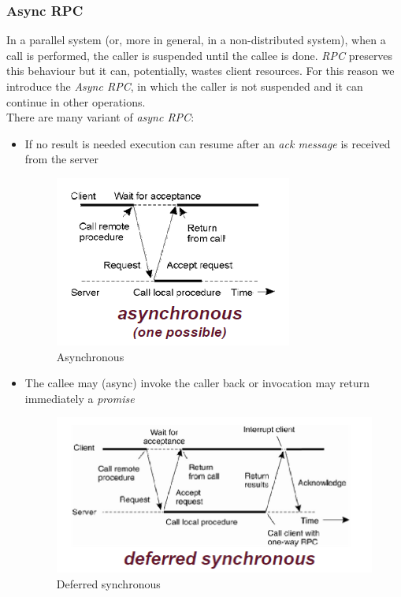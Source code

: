 \subsubsection{Async RPC}
In a parallel system (or, more in general, in a non-distributed system), when a call is performed, the caller is suspended until the callee is done. \textit{RPC} preserves this behaviour but it can, potentially, wastes client resources.
For this reason we introduce the \textit{Async RPC}, in which the caller is not suspended and it can continue in other operations.\\
There are many variant of \textit{async RPC}:
\begin{itemize}
    \item If no result is needed execution can resume after an \textit{ack message} is received from the server
    \begin{figure}[h]
        \caption{Asynchronous}
        \includegraphics[scale=0.6]{src/images/communication/async.png}
        \centering
    \end{figure}

    \item The callee may (async) invoke the caller back or invocation may return immediately a \textit{promise}
    \begin{figure}[h]
        \caption{Deferred synchronous}
        \includegraphics[scale=0.6]{src/images/communication/deferred-synchronous.png}
        \centering
    \end{figure}
\end{itemize}

